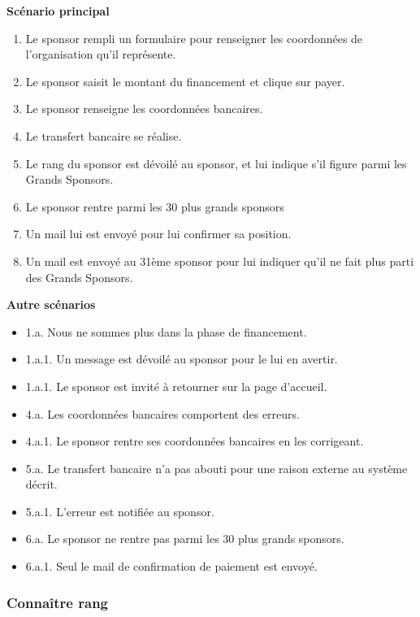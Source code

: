 \documentclass[11pt,a4paper]{article}
\begin{document}
\textbf{Scénario principal}

\begin{enumerate}
    \item Le sponsor rempli un formulaire pour renseigner les coordonnées de l’organisation qu’il représente.
    \item Le sponsor saisit le montant du financement et clique sur payer.
    \item Le sponsor renseigne les coordonnées bancaires.
    \item Le transfert bancaire se réalise.
    \item Le rang du sponsor est dévoilé au sponsor, et lui indique s’il figure parmi les Grands Sponsors.
    \item Le sponsor rentre parmi les 30 plus grands sponsors
    \item Un mail lui est envoyé pour lui confirmer sa position.
    \item Un mail est envoyé au 31ème sponsor pour lui indiquer qu’il ne fait plus parti des Grands Sponsors.
\end{enumerate}

\textbf{Autre scénarios}

\begin{itemize}[label=]
    \item 1.a. Nous ne sommes plus dans la phase de financement.
    \item 1.a.1. Un message est dévoilé au sponsor pour le lui en avertir.
    \item 1.a.1. Le sponsor est invité à retourner sur la page d’accueil.
    \item 4.a. Les coordonnées bancaires comportent des erreurs.
    \item 4.a.1. Le sponsor rentre ses coordonnées bancaires en les corrigeant.
    \item 5.a.   Le transfert bancaire n’a pas abouti pour une raison externe au système décrit.
    \item 5.a.1. L’erreur est notifiée au sponsor.
    \item 6.a.  Le sponsor ne rentre pas parmi les 30 plus grands sponsors.
    \item 6.a.1. Seul le mail de confirmation de paiement est envoyé.

\end{itemize}



\subsubsection{Connaître rang}
\end{document}
